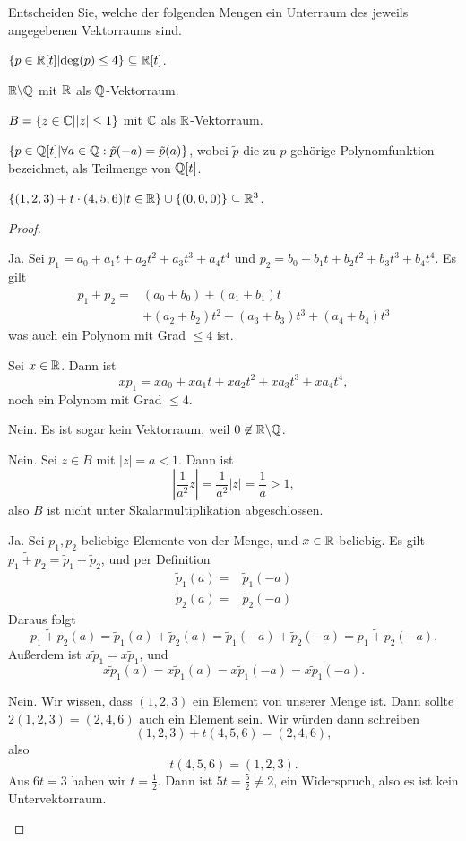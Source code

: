 \begin{Problem}
	Entscheiden Sie, welche der folgenden Mengen ein Unterraum des jeweils angegebenen Vektorraums sind.
	\begin{parts}
		\item $\left\{ p\in \mathbb{R}[t]|\text{deg}(p)\le 4 \right\} \subseteq \mathbb{R}[t]$.
		\item $\mathbb{R}\backslash \mathbb{Q}$ mit $\mathbb{R}$ als $\mathbb{Q}$-Vektorraum.
		\item $B=\left\{ z\in \mathbb{C}| |z|\le 1 \right\} $ mit $\mathbb{C}$ als $\mathbb{R}$-Vektorraum.
		\item $\left\{ p\in \mathbb{Q}[t]|\forall a\in \mathbb{Q}:\tilde{p}(-a)=\tilde{p}(a) \right\} $, wobei $\tilde{p}$ die zu $p$ gehörige Polynomfunktion bezeichnet, als Teilmenge von $\mathbb{Q}[t]$.
		\item $\left\{ (1,2,3)+t\cdot (4,5,6)|t\in \mathbb{R} \right\} \cup \left\{ (0,0,0) \right\} \subseteq \mathbb{R}^3$.
	\end{parts}
\end{Problem}
\begin{proof}
	\begin{parts}
	\item Ja. Sei $p_1=a_0+a_1t+a_2t^2+a_3t^3+a_4t^4$ und $p_2=b_0+b_1t+b_2t^2+b_3t^3+b_4t^4$. Es gilt
		\begin{align*}
			p_1+p_2=&(a_0+b_0)+(a_1+b_1)t\\
				&+(a_2+b_2)t^2+(a_3+b_3)t^3+(a_4+b_4)t^3
	\end{align*}
	was auch ein Polynom mit Grad $\le 4$ ist.

	Sei $x\in \mathbb{R}$. Dann ist
	\[
	x p_1=xa_0+xa_1t+xa_2t^2+xa_3t^3+xa_4t^4
	,\] 
	noch ein Polynom mit Grad $\le 4$.
\item Nein. Es ist sogar kein Vektorraum, weil $0\not\in \mathbb{R}\backslash \mathbb{Q}$. 
\item Nein. Sei $z\in B$ mit $|z|=a<1$. Dann ist
	\[
	\left| \frac{1}{a^2}z \right| =\frac{1}{a^2}|z|=\frac{1}{a}>1
	,\] 
	also $B$ ist nicht unter Skalarmultiplikation abgeschlossen.
\item Ja. Sei $p_1,p_2$ beliebige Elemente von der Menge, und $x\in \mathbb{R}$ beliebig. Es gilt $\tilde{p_1+p_2}=\tilde{p}_1+\tilde{p}_2$, und per Definition
	\begin{align*}
		\tilde{p}_1(a)=&\tilde{p}_1(-a)\\
		\tilde{p}_2(a)=&\tilde{p}_2(-a)
	\end{align*}
Daraus folgt
\[
	\tilde{p_1+p_2}(a)=\tilde{p}_1(a)+\tilde{p}_2(a)=\tilde{p}_1(-a)+\tilde{p}_2(-a)=\tilde{p_1+p_2}(-a)
.\] 
Außerdem ist $\tilde{x p_1}=x\tilde{p}_1$, und
\[
	\tilde{x p_1}(a)=x\tilde{p}_1(a)=x\tilde{p}_1(-a)=\tilde{x p_1}(-a)
.\] 
\item Nein. Wir wissen, dass $(1,2,3)$ ein Element von unserer Menge ist. Dann sollte $2(1,2,3)=(2, 4, 6)$ auch ein Element sein. Wir würden dann schreiben
	\[
		(1,2,3)+t(4,5,6)=(2,4,6)
	,\] 
	also
	\[
	t(4,5,6)=(1,2,3)
	.\] 
	Aus $6t=3$ haben wir $t=\frac{1}{2}$. Dann ist $5t=\frac{5}{2}\neq 2$, ein Widerspruch, also es ist kein Untervektorraum.\qedhere
	\end{parts}
\end{proof}
